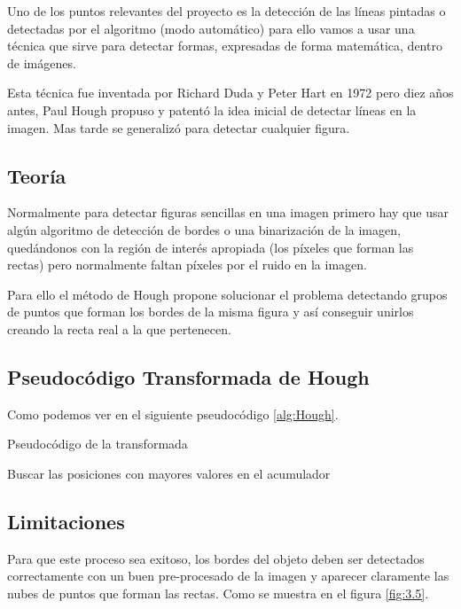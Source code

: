 Uno de los puntos relevantes del proyecto es la detección de las líneas pintadas o detectadas por el algoritmo (modo automático) para ello vamos a usar una técnica que sirve para detectar formas, expresadas de forma matemática, dentro de imágenes.

Esta técnica fue inventada por Richard Duda y Peter Hart en 1972 pero diez años antes, Paul Hough propuso y patentó \cite{pat:patHough} la idea inicial de detectar líneas en la imagen. Mas tarde se generalizó para detectar cualquier figura.

\subsection{Teoría}

Normalmente para detectar figuras sencillas en una imagen primero hay que usar algún algoritmo de detección de bordes o una binarización de la imagen, quedándonos con la región de interés apropiada (los píxeles que forman las rectas) pero normalmente faltan píxeles por el ruido en la imagen.

Para ello el método de Hough propone solucionar el problema detectando grupos de puntos que forman los bordes de la misma figura y así conseguir unirlos creando la recta real a la que pertenecen.

\subsection{Pseudocódigo Transformada de Hough}
Como podemos ver en el siguiente pseudocódigo 
\ref{alg:Hough}.

\begin{algorithm*}
\caption{Pseudocódigo de la transformada}
\DontPrintSemicolon
{}


Buscar las posiciones con mayores valores en el acumulador\;	

\label{alg:Hough}
\end{algorithm*}

\subsection{Limitaciones}
Para que este proceso sea exitoso, los bordes del objeto deben ser detectados correctamente con un buen pre-procesado de la imagen y aparecer claramente las nubes de puntos que forman las rectas.
Como se muestra en el figura \ref{fig:3.5}.

